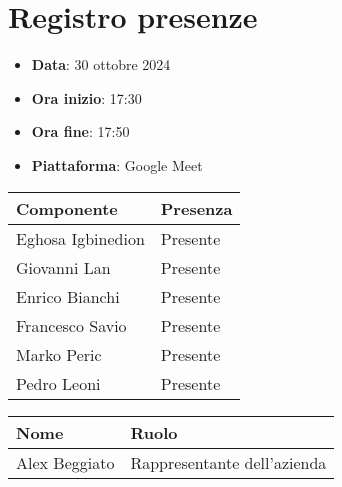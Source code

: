 \documentclass[a4paper, 12pt]{article}
\begin{document}
\section{Registro presenze}
\begin{itemize}
    \item[] \textbf{Data}: 30 ottobre 2024
    \item[] \textbf{Ora inizio}:  17:30
    \item[] \textbf{Ora fine}: 17:50
    \item[] \textbf{Piattaforma}: Google Meet	
\end{itemize}
\begin{table}[!h]
\centering
{\renewcommand{\arraystretch}{2}
\begin{tabularx}{\textwidth}{| X | X |}
    \hline
        \textbf{\large Componente} & 
        \textbf{\large Presenza} \\ 
    \hline 
    \hline
        Eghosa Igbinedion&
        Presente \\
    \hline 
        Giovanni Lan&
        Presente \\
    \hline 
        Enrico Bianchi&
        Presente \\
    \hline 
        Francesco Savio&
        Presente \\
    \hline 
        Marko Peric&
        Presente \\
    \hline 
        Pedro Leoni&
        Presente \\
    \hline 

\end{tabularx}}
\end{table}

\begin{table}[!h]
    \centering
    {\renewcommand{\arraystretch}{2}
    \begin{tabularx}{\textwidth}{| X | X |}
        \hline
            \textbf{\large Nome} & 
            \textbf{\large Ruolo} \\ 
        \hline 
        \hline
            Alex Beggiato&
            Rappresentante dell'azienda \\
        \hline 
    
    \end{tabularx}}
\end{table}

\newpage
\end{document}
